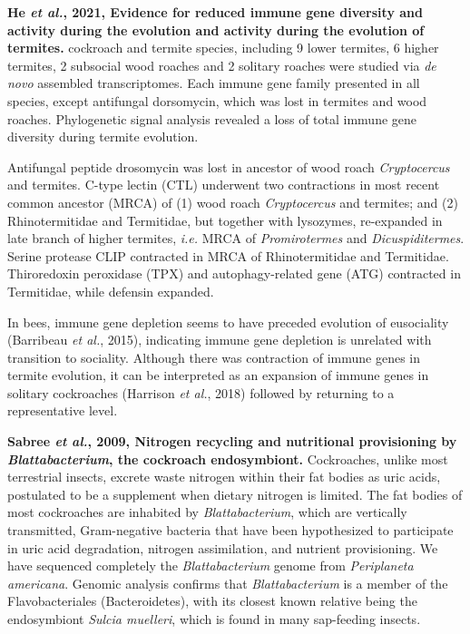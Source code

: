 \documentclass[11pt]{article}
\begin{document}
\begin{sloppypar}
\textbf{He \textit{et al.}, 2021, Evidence for reduced immune gene diversity and activity during the evolution and activity during the evolution of termites.}  cockroach and termite species, including 9 lower termites, 6 higher termites, 2 subsocial wood roaches and 2 solitary roaches were studied via \textit{de novo} assembled transcriptomes. 
Each immune gene family presented in all species, except antifungal dorsomycin, which was lost in termites and wood roaches. 
Phylogenetic signal analysis revealed a loss of total immune gene diversity during termite evolution. 
\par
Antifungal peptide drosomycin was lost in ancestor of wood roach \textit{Cryptocercus} and termites. 
C-type lectin (CTL) underwent two contractions in most recent common ancestor (MRCA) of (1) wood roach \textit{Cryptocercus} and termites; and (2) Rhinotermitidae and Termitidae, but together with lysozymes, re-expanded in late branch of higher termites, \textit{i.e.} MRCA of \textit{Promirotermes} and \textit{Dicuspiditermes}. 
Serine protease CLIP contracted in MRCA of Rhinotermitidae and Termitidae. 
Thiroredoxin peroxidase (TPX) and autophagy-related gene (ATG) contracted in Termitidae, while defensin expanded. 
\par
In bees, immune gene depletion seems to have preceded evolution of eusociality (Barribeau \textit{et al.}, 2015), indicating immune gene depletion is unrelated with transition to sociality. 
Although there was contraction of immune genes in termite evolution, it can be interpreted as an expansion of immune genes in solitary cockroaches (Harrison \textit{et al.}, 2018) followed by returning to a representative level.
\par
\textbf{Sabree \textit{et al.}, 2009, Nitrogen recycling and nutritional provisioning by \textit{Blattabacterium}, the cockroach endosymbiont.} \newline
Cockroaches, unlike most terrestrial insects, excrete waste nitrogen within their fat bodies as uric acids, postulated to be a supplement when dietary nitrogen is limited. 
The fat bodies of most cockroaches are inhabited by \textit{Blattabacterium}, which are vertically transmitted, Gram-negative bacteria that have been hypothesized to participate in uric acid degradation, nitrogen assimilation, and nutrient provisioning. 
We have sequenced completely the \textit{Blattabacterium} genome from \textit{Periplaneta americana}. 
Genomic analysis confirms that \textit{Blattabacterium} is a member of the Flavobacteriales (Bacteroidetes), with its closest known relative being the endosymbiont \textit{Sulcia muelleri}, which is found in many sap-feeding insects. 

\end{sloppypar}
\end{document}
